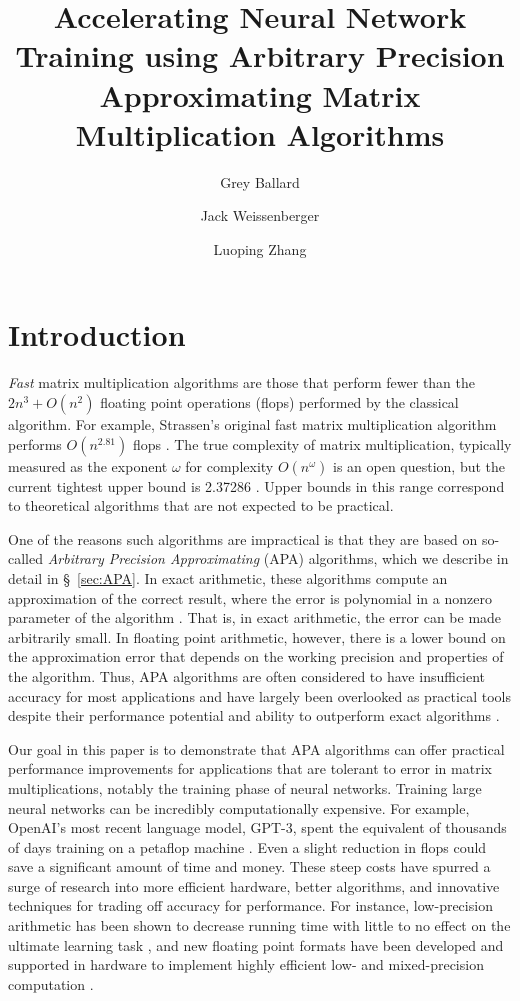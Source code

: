 \documentclass[manuscript]{acmart}
\title[Accelerating NN Training using APA Matrix Multiplication Algorithms]{Accelerating Neural Network Training using Arbitrary Precision Approximating Matrix Multiplication Algorithms}
\author{Grey Ballard}
\affiliation{%
   \institution{Wake Forest University}
   \city{Winston-Salem, NC}
   \country{USA}}
\author{Jack Weissenberger}
\affiliation{%
   \institution{Wake Forest University}
   \city{Winston-Salem, NC}
   \country{USA}}
\author{Luoping Zhang}
\affiliation{%
   \institution{Wake Forest University}
   \city{Winston-Salem, NC}
   \country{USA}}
\begin{document}
\maketitle

\section{Introduction}

\emph{Fast} matrix multiplication algorithms are those that perform fewer than the $2n^3+O(n^2)$ floating point operations (flops) performed by the classical algorithm.
For example, Strassen's original fast matrix multiplication algorithm performs $O(n^{2.81})$ flops \cite{Strassen69}.
The true complexity of matrix multiplication, typically measured as the exponent $\omega$ for complexity $O(n^\omega)$ is an open question, but the current tightest upper bound is 2.37286 \cite{AW21}.
Upper bounds in this range correspond to theoretical algorithms that are not expected to be practical.

One of the reasons such algorithms are impractical is that they are based on so-called \emph{Arbitrary Precision Approximating} (APA) algorithms, which we describe in detail in \S~\ref{sec:APA}.
In exact arithmetic, these algorithms compute an approximation of the correct result, where the error is polynomial in a nonzero parameter of the algorithm \cite{BLR80}.
That is, in exact arithmetic, the error can be made arbitrarily small.
In floating point arithmetic, however, there is a lower bound on the approximation error that depends on the working precision and properties of the algorithm.
Thus, APA algorithms are often considered to have insufficient accuracy for most applications and have largely been overlooked as practical tools despite their performance potential and ability to outperform exact algorithms \cite{BB15}.

Our goal in this paper is to demonstrate that APA algorithms can offer practical performance improvements for applications that are tolerant to error in matrix multiplications, notably the training phase of neural networks.
Training large neural networks can be incredibly computationally expensive.
For example,  OpenAI's most recent language model, GPT-3, spent the equivalent of thousands of days training on a petaflop machine \cite{BM+20}. 
Even a slight reduction in flops could save a significant amount of time and money.
These steep costs have spurred a surge of research into more efficient hardware, better algorithms, and innovative techniques for trading off accuracy for performance.
For instance, low-precision arithmetic has been shown to decrease running time with little to no effect on the ultimate learning task \cite{GAGN15,HCSEB17}, and new floating point formats have been developed and supported in hardware to implement highly efficient low- and mixed-precision computation \cite{KM+19,YWC20}.
\end{document}
